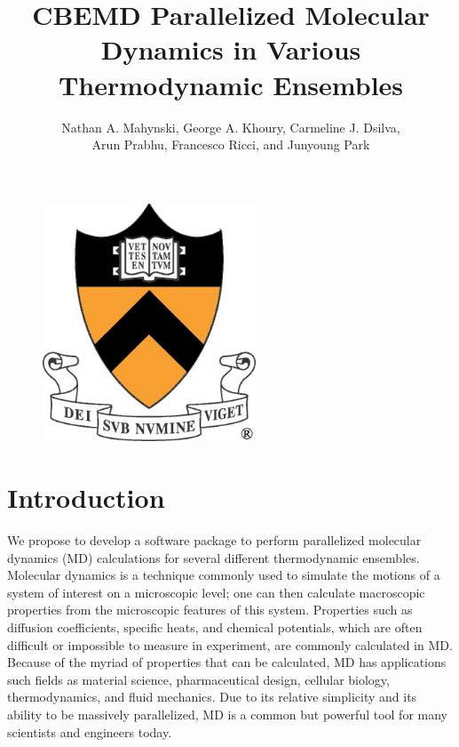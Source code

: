 \documentclass[10pt]{article}
\title{\textbf{CBEMD} Parallelized Molecular Dynamics in Various Thermodynamic Ensembles}
\author{Nathan A. Mahynski, George A. Khoury, Carmeline J. Dsilva, \\
Arun Prabhu, Francesco Ricci, and Junyoung Park}
\date{}
\begin{document}
\maketitle
\begin{figure}[htbp]
   \centering
   \includegraphics[width=2.5in]{princeton.jpg}
\end{figure}
\thispagestyle{empty}
\newpage
\setcounter{page}{1}
\newpage

\section{Introduction}
We propose to develop a software package to perform parallelized molecular dynamics (MD) calculations for several different thermodynamic ensembles. 
%
Molecular dynamics is a technique commonly used to simulate the motions of a system of interest on a microscopic level; one can then calculate macroscopic properties from the microscopic features of this system. 
%
Properties such as diffusion coefficients, specific heats, and chemical potentials, which are often difficult or impossible to measure in experiment, are commonly calculated in MD.  
%
Because of the myriad of properties that can be calculated, MD has applications such fields as material science, pharmaceutical design, cellular biology, thermodynamics, and fluid mechanics.  
%
Due to its relative simplicity and its ability to be massively parallelized, MD is a common but powerful tool for many scientists and engineers today.
\end{document}

